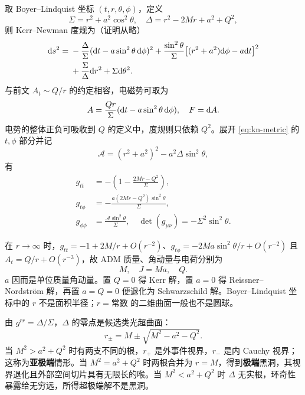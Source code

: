 取 Boyer--Lindquist 坐标 $(t,r,\theta,\phi)$，定义
\begin{equation}
    \Sigma=r^2+a^2\cos^2\theta,\quad
    \Delta=r^2-2Mr+a^2+Q^2,
\end{equation}
则 Kerr--Newman 度规为（证明从略）
\begin{equation}\label{eq:kn-metric}
\begin{split}
    \dd s^2={}&-\frac{\Delta}{\Sigma}
       (\dd t-a\sin^2\theta\,\dd\phi)^2
       +\frac{\sin^2\theta}{\Sigma}
       \bigl[(r^2+a^2)\dd\phi-a\dd t\bigr]^2\\
       &+\frac{\Sigma}{\Delta}\dd r^2+\Sigma\dd\theta^2 .
\end{split}
\end{equation}
与前文 $A_t\sim Q/r$ 的约定相容，电磁势可取为
\begin{equation}
    A=\frac{Qr}{\Sigma}
       (\dd t-a\sin^2\theta\,\dd\phi),
    \quad F=\dd A .
\end{equation}
电势的整体正负可吸收到 $Q$ 的定义中，度规则只依赖 $Q^2$。展开 \eqref{eq:kn-metric} 的 $t,\phi$ 部分并记
\[
    \mathcal A=(r^2+a^2)^2-a^2\Delta\sin^2\theta,
\]
有
\begin{equation}
\begin{split}
    g_{tt}&=-\left(1-\frac{2Mr-Q^2}{\Sigma}\right),\\
    g_{t\phi}&=-\frac{a(2Mr-Q^2)\sin^2\theta}{\Sigma},\\
    g_{\phi\phi}&=\frac{\mathcal A\sin^2\theta}{\Sigma},\quad
    \det(g_{\mu\nu})=-\Sigma^2\sin^2\theta .
\end{split}
\end{equation}

在 $r\to\infty$ 时，$g_{tt}=-1+2M/r+O(r^{-2})$、$g_{t\phi}=-2Ma\sin^2\theta/r+O(r^{-2})$ 且 $A_t=Q/r+O(r^{-3})$，故 ADM 质量、角动量与电荷分别为
\[
    M,\quad J=Ma,\quad Q.
\]
$a$ 因而是单位质量角动量。置 $Q=0$ 得 Kerr 解，置 $a=0$ 得 Reissner--Nordstr\"om 解，再置 $a=Q=0$ 便退化为 Schwarzschild 解。Boyer--Lindquist 坐标中的 $r$ 不是面积半径；$r=\text{常数}$ 的二维曲面一般也不是圆球。

由 $g^{rr}=\Delta/\Sigma$，$\Delta$ 的零点是候选类光超曲面：
\begin{equation}
    r_\pm=M\pm\sqrt{M^2-a^2-Q^2}.
\end{equation}
当 $M^2>a^2+Q^2$ 时有两支不同的根，$r_+$ 是外事件视界，$r_-$ 是内 Cauchy 视界；这称为\textbf{亚极端}情形。当 $M^2=a^2+Q^2$ 时两根合并为 $r=M$，得到\textbf{极端}黑洞，其视界退化且外部空间切片具有无限长的喉。当 $M^2<a^2+Q^2$ 时 $\Delta$ 无实根，环奇性暴露给无穷远，所得超极端解不是黑洞。

